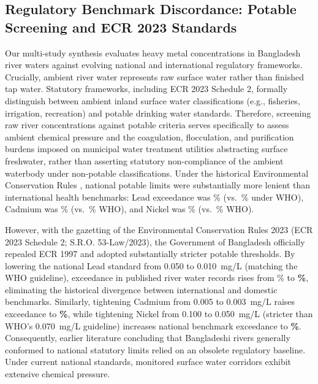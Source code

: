 \documentclass[authoryear,preprint,12pt]{elsarticle}
\begin{document}
\subsection{Regulatory Benchmark Discordance: Potable Screening and ECR 2023 Standards}
Our multi-study synthesis evaluates heavy metal concentrations in Bangladesh river waters against evolving national and international regulatory frameworks. Crucially, ambient river water represents raw surface water rather than finished tap water. Statutory frameworks, including ECR 2023 Schedule 2, formally distinguish between ambient inland surface water classifications (e.g., fisheries, irrigation, recreation) and potable drinking water standards. Therefore, screening raw river concentrations against potable criteria serves specifically to assess ambient chemical pressure and the coagulation, flocculation, and purification burdens imposed on municipal water treatment utilities abstracting surface freshwater, rather than asserting statutory non-compliance of the ambient waterbody under non-potable classifications. Under the historical Environmental Conservation Rules \citep{ECR1997}, national potable limits were substantially more lenient than international health benchmarks: Lead exceedance was \LeadBdNineteenNinetySevenExceedPct\% (vs.\ \LeadWhoExceedPct\% under WHO), Cadmium was \CadmiumBdNineteenNinetySevenExceedPct\% (vs.\ \CadmiumWhoExceedPct\% WHO), and Nickel was \NickelBdNineteenNinetySevenExceedPct\% (vs.\ \NickelWhoExceedPct\% WHO). 

However, with the gazetting of the Environmental Conservation Rules 2023 (ECR 2023 Schedule 2; S.R.O. 53-Law/2023), the Government of Bangladesh officially repealed ECR 1997 and adopted substantially stricter potable thresholds. By lowering the national Lead standard from 0.050 to 0.010~mg/L (matching the WHO guideline), exceedance in published river water records rises from \LeadBdNineteenNinetySevenExceedPct\% to \textbf{\LeadBdTwentyTwentyThreeExceedPct\%}, eliminating the historical divergence between international and domestic benchmarks. Similarly, tightening Cadmium from 0.005 to 0.003~mg/L raises exceedance to \textbf{\CadmiumBdTwentyTwentyThreeExceedPct\%}, while tightening Nickel from 0.100 to 0.050~mg/L (stricter than WHO's 0.070~mg/L guideline) increases national benchmark exceedance to \textbf{\NickelBdTwentyTwentyThreeExceedPct\%}. Consequently, earlier literature concluding that Bangladeshi rivers generally conformed to national statutory limits relied on an obsolete regulatory baseline. Under current national standards, monitored surface water corridors exhibit extensive chemical pressure.
\end{document}
